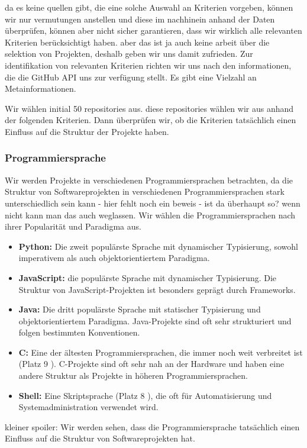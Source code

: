 da es keine quellen gibt, die eine solche Auswahl an Kriterien vorgeben, können wir nur vermutungen anstellen und diese im nachhinein anhand der Daten überprüfen, können aber nicht sicher garantieren, dass wir wirklich alle relevanten Kriterien berücksichtigt haben. aber das ist ja auch keine arbeit über die selektion von Projekten, deshalb geben wir uns damit zufrieden.
Zur identifikation von relevanten Kriterien richten wir uns nach den informationen, die die GitHub API uns zur verfügung stellt. Es gibt eine Vielzahl an Metainformationen. 

Wir wählen initial 50 repositories aus. diese repositories wählen wir aus anhand der folgenden Kriterien. Dann überprüfen wir, ob die Kriterien tatsächlich einen Einfluss auf die Struktur der Projekte haben.

\subsubsection*{Programmiersprache} Wir werden Projekte in verschiedenen Programmiersprachen betrachten, da die Struktur von Softwareprojekten in verschiedenen Programmiersprachen stark unterschiedlich sein kann - hier fehlt noch ein beweis - ist da überhaupt so? wenn nicht kann man das auch weglassen. Wir wählen die Programmiersprachen nach ihrer Popularität und Paradigma aus. 
    \begin{itemize}
        \item \textbf{Python:} Die zweit populärste Sprache \cite{software_state_2022} mit dynamischer Typisierung, sowohl imperativem als auch objektorientiertem Paradigma. 
        \item \textbf{JavaScript:} die populärste Sprache \cite{software_state_2022} mit dynamischer Typisierung. Die Struktur von JavaScript-Projekten ist besonders geprägt durch Frameworks.
        \item \textbf{Java:} Die dritt populärste Sprache \cite{software_state_2022} mit statischer Typisierung und objektorientiertem Paradigma. Java-Projekte sind oft sehr strukturiert und folgen bestimmten Konventionen.
        \item \textbf{C:} Eine der ältesten Programmiersprachen, die immer noch weit verbreitet ist (Platz 9 \cite{software_state_2022}). C-Projekte sind oft sehr nah an der Hardware und haben eine andere Struktur als Projekte in höheren Programmiersprachen.
        \item \textbf{Shell:} Eine Skriptsprache (Platz 8 \cite{software_state_2022}), die oft für Automatisierung und Systemadministration verwendet wird.
    \end{itemize}
   kleiner spoiler: Wir werden sehen, dass die Programmiersprache tatsächlich einen Einfluss auf die Struktur von Softwareprojekten hat.


